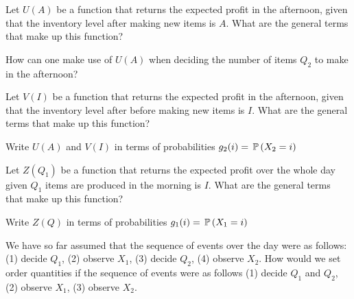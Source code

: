 \begin{exercise}
Let $U(A)$ be a function that returns the expected profit in the afternoon, given that the inventory level after making new items is $A$. What are the general terms that make up this function?

\end{exercise}

\begin{exercise}
How can one make use of $U(A)$ when deciding the number of items $Q_2$ to make in the afternoon?

\end{exercise}

\begin{exercise}
Let $V(I)$ be a function that returns the expected profit in the afternoon, given that the inventory level after before making new items is $I$. What are the general terms that make up this function?

\end{exercise}

\begin{exercise}
Write $U(A)$ and $V(I)$ in terms of probabilities $g_2(i)=\P(X_2=i)$

\end{exercise}

\begin{exercise}
Let $Z(Q_1)$ be a function that returns the expected profit over the whole day given $Q_1$ items are produced in the morning is $I$. What are the general terms that make up this function?

\end{exercise}

\begin{exercise}
Write $Z(Q)$ in terms of probabilities $g_1(i)=\P(X_1=i)$

\end{exercise}

\begin{exercise}
We have so far assumed that the sequence of events over the day were as follows: (1) decide $Q_1$, (2) observe $X_1$, (3) decide $Q_2$, (4) observe $X_2$. How would we set order quantities if the sequence of events were as follows (1) decide $Q_1$ and $Q_2$, (2) observe $X_1$, (3) observe $X_2$.

\end{exercise}

